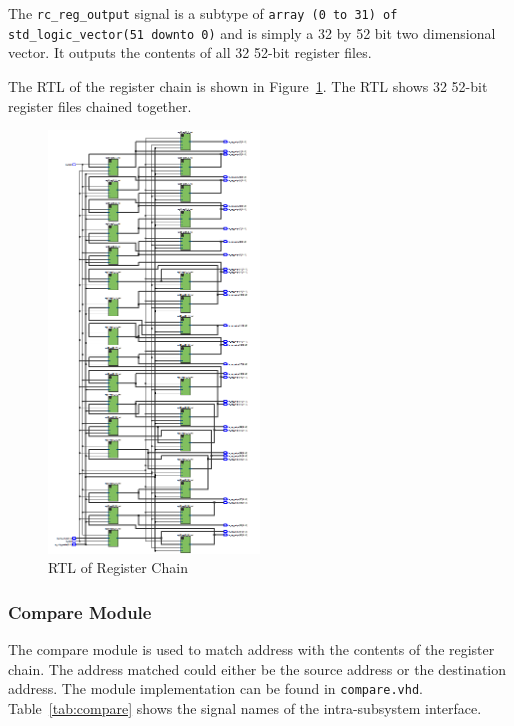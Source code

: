 \documentclass{article}
\begin{document}
The \texttt{rc\_reg\_output} signal is a subtype of \texttt{array (0 to 31) of std\_logic\_vector(51 downto 0)} and is simply a 32 by 52 bit two dimensional vector. It outputs the contents of all 32 52-bit register files.

The RTL of the register chain is shown in Figure~\ref{fig:regchain-rtl}. The RTL shows 32 52-bit register files chained together.

\begin{figure}[ht!]
  \centering
  	\includegraphics[width=0.5\textwidth]{register_chain_rtl.PNG}
  \caption{RTL of Register Chain}
  \label{fig:regchain-rtl}
\end{figure}

\newpage
\subsubsection{Compare Module}

The compare module is used to match address with the contents of the register chain. The address matched could either be the source address or the destination address. The module implementation can be found in \texttt{compare.vhd}. Table~\ref{tab:compare} shows the signal names of the intra-subsystem interface. 
\end{document}

